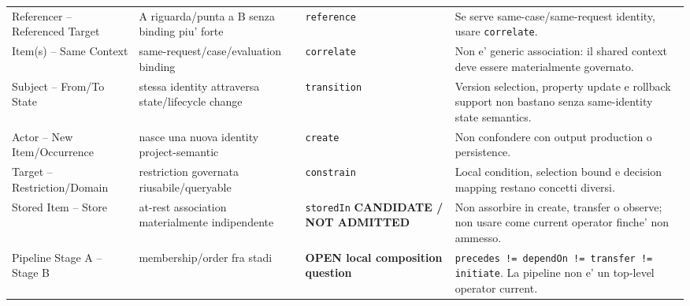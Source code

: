 \documentclass[11pt,a4paper]{article}
\begin{document}
\begin{landscape}
\begin{longtable}{L{38mm}L{44mm}L{55mm}L{92mm}}
Referencer -- Referenced Target & A riguarda/punta a B senza binding piu' forte & \texttt{reference} & Se serve same-case/same-request identity, usare \texttt{correlate}. \\

Item(s) -- Same Context & same-request/case/evaluation binding & \texttt{correlate} & Non e' generic association: il shared context deve essere materialmente governato. \\

Subject -- From/To State & stessa identity attraversa state/lifecycle change & \texttt{transition} & Version selection, property update e rollback support non bastano senza same-identity state semantics. \\

Actor -- New Item/Occurrence & nasce una nuova identity project-semantic & \texttt{create} & Non confondere con output production o persistence. \\

Target -- Restriction/Domain & restriction governata riusabile/queryable & \texttt{constrain} & Local condition, selection bound e decision mapping restano concetti diversi. \\

Stored Item -- Store & at-rest association materialmente indipendente & \texttt{storedIn} \textbf{CANDIDATE / NOT ADMITTED} & Non assorbire in create, transfer o observe; non usare come current operator finche' non ammesso. \\

Pipeline Stage A -- Stage B & membership/order fra stadi & \textbf{OPEN local composition question} & \texttt{precedes != dependOn != transfer != initiate}. La pipeline non e' un top-level operator current. \\
\bottomrule
\end{longtable}
\end{landscape}
\end{document}
